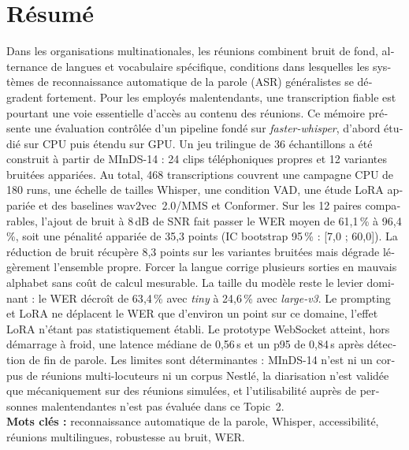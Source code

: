\documentclass[12pt]{report}
\begin{document}
\section*{Résumé}
{}
\begin{otherlanguage}{french}
Dans les organisations multinationales, les réunions combinent bruit de fond, alternance de langues et vocabulaire spécifique, conditions dans lesquelles les systèmes de reconnaissance automatique de la parole (ASR) généralistes se dégradent fortement. Pour les employés malentendants, une transcription fiable est pourtant une voie essentielle d'accès au contenu des réunions. Ce mémoire présente une évaluation contrôlée d'un pipeline fondé sur \textit{faster-whisper}, d'abord étudié sur CPU puis étendu sur GPU. Un jeu trilingue de 36 échantillons a été construit à partir de MInDS-14 : 24 clips téléphoniques propres et 12 variantes bruitées appariées. Au total, 468 transcriptions couvrent une campagne CPU de 180 runs, une échelle de tailles Whisper, une condition VAD, une étude LoRA appariée et des baselines wav2vec~2.0/MMS et Conformer. Sur les 12 paires comparables, l'ajout de bruit à 8\,dB de SNR fait passer le WER moyen de 61{,}1\,\% à 96{,}4\,\%, soit une pénalité appariée de 35{,}3 points (IC bootstrap 95\,\% : [7{,}0 ; 60{,}0]). La réduction de bruit récupère 8{,}3 points sur les variantes bruitées mais dégrade légèrement l'ensemble propre. Forcer la langue corrige plusieurs sorties en mauvais alphabet sans coût de calcul mesurable. La taille du modèle reste le levier dominant : le WER décroît de 63{,}4\,\% avec \textit{tiny} à 24{,}6\,\% avec \textit{large-v3}. Le prompting et LoRA ne déplacent le WER que d'environ un point sur ce domaine, l'effet LoRA n'étant pas statistiquement établi. Le prototype WebSocket atteint, hors démarrage à froid, une latence médiane de 0{,}56\,s et un p95 de 0{,}84\,s après détection de fin de parole. Les limites sont déterminantes : MInDS-14 n'est ni un corpus de réunions multi-locuteurs ni un corpus Nestlé, la diarisation n'est validée que mécaniquement sur des réunions simulées, et l'utilisabilité auprès de personnes malentendantes n'est pas évaluée dans ce Topic~2.
\\
\textbf{Mots clés :} reconnaissance automatique de la parole, Whisper, accessibilité, réunions multilingues, robustesse au bruit, WER.
\end{otherlanguage}
\thispagestyle{fancy}
\newpage
\end{document}
